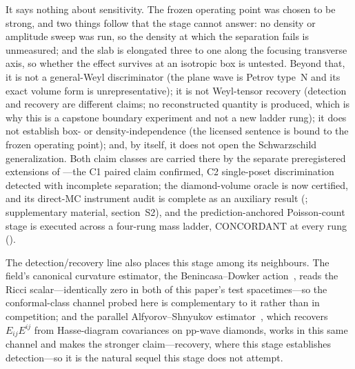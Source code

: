 It says nothing about sensitivity. The frozen operating point was chosen to
be strong, and two things follow that the stage cannot answer: no density or
amplitude sweep was run, so the density at which the separation fails is
unmeasured; and the slab is elongated three to one along the focusing
transverse axis, so whether the effect survives at an isotropic box is
untested. Beyond that, it is not a general-Weyl discriminator (the plane wave
is Petrov type~N and its exact volume form is unrepresentative); it is not
Weyl-tensor recovery
(detection and recovery are different claims; no reconstructed quantity is
produced, which is why this is a capstone boundary experiment and not a new
ladder rung); it does not establish box- or density-independence (the
licensed sentence is bound to the frozen operating point); and, by itself, it
does not open the Schwarzschild generalization. Both claim classes are
carried there by the separate preregistered extensions of
---the C1 paired claim confirmed, C2 single-poset
discrimination detected with incomplete separation; the diamond-volume
oracle is now certified, and its direct-MC instrument audit is complete as an
auxiliary result (; supplementary material,
section~S2), and
the prediction-anchored Poisson-count stage is executed across a four-rung
mass ladder, CONCORDANT at every rung ().

The detection/recovery line also places this stage among its neighbours. The
field's canonical curvature estimator, the Benincasa--Dowker
action~\cite{benincasadowker2010}, reads the Ricci scalar---identically zero
in both of this paper's test spacetimes---so the conformal-class channel
probed here is complementary to it rather than in competition; and the
parallel Alfyorov--Shnyukov estimator~\cite{alfyorov2026weyl}, which
recovers $E_{ij}E^{ij}$ from Hasse-diagram covariances on pp-wave diamonds,
works in this same channel and makes the stronger claim---recovery, where
this stage establishes detection---so it is the natural sequel this stage
does not attempt.
